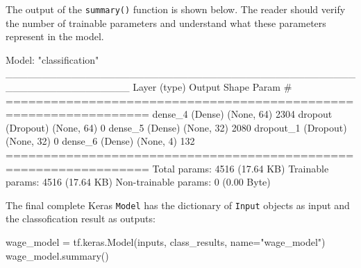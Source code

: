 The output of the \texttt{summary()} function is shown below. The reader should verify the number of trainable parameters and understand what these parameters represent in the model.

\begin{samepage}
\begin{textcode}
Model: "classification"
_________________________________________________________________
 Layer (type)                Output Shape              Param #   
=================================================================
 dense_4 (Dense)             (None, 64)                2304      
 dropout (Dropout)           (None, 64)                0         
 dense_5 (Dense)             (None, 32)                2080      
 dropout_1 (Dropout)         (None, 32)                0         
 dense_6 (Dense)             (None, 4)                 132       
=================================================================
Total params: 4516 (17.64 KB)
Trainable params: 4516 (17.64 KB)
Non-trainable params: 0 (0.00 Byte)
\end{textcode}
\end{samepage}

The final complete Keras \texttt{Model} has the dictionary of \texttt{Input} objects as input and the classofication result as outputs:

\begin{samepage}
\begin{pythoncode}
wage_model = tf.keras.Model(inputs, class_results, name="wage_model")
wage_model.summary()
\end{pythoncode}
\end{samepage}

